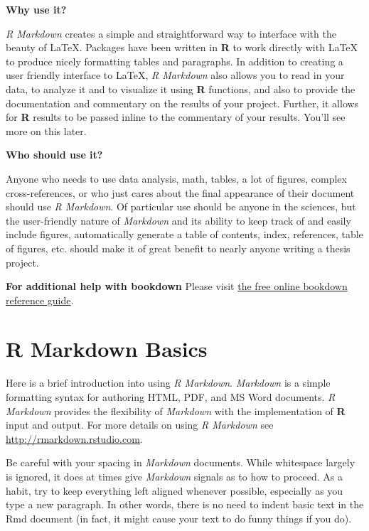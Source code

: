 \documentclass[
  letterpaper,
  12pt,
  twoside]{book}
\begin{document}
\textbf{Why use it?}

\emph{R Markdown} creates a simple and straightforward way to interface
with the beauty of LaTeX. Packages have been written in \textbf{R} to
work directly with LaTeX to produce nicely formatting tables and
paragraphs. In addition to creating a user friendly interface to LaTeX,
\emph{R Markdown} also allows you to read in your data, to analyze it
and to visualize it using \textbf{R} functions, and also to provide the
documentation and commentary on the results of your project. Further, it
allows for \textbf{R} results to be passed inline to the commentary of
your results. You'll see more on this later.

\textbf{Who should use it?}

Anyone who needs to use data analysis, math, tables, a lot of figures,
complex cross-references, or who just cares about the final appearance
of their document should use \emph{R Markdown}. Of particular use should
be anyone in the sciences, but the user-friendly nature of
\emph{Markdown} and its ability to keep track of and easily include
figures, automatically generate a table of contents, index, references,
table of figures, etc. should make it of great benefit to nearly anyone
writing a thesis project.

\textbf{For additional help with bookdown} Please visit
\href{https://bookdown.org/yihui/bookdown/}{the free online bookdown
reference guide}.


\chapter{R Markdown Basics}\label{rmd-basics}

Here is a brief introduction into using \emph{R Markdown}.
\emph{Markdown} is a simple formatting syntax for authoring HTML, PDF,
and MS Word documents. \emph{R Markdown} provides the flexibility of
\emph{Markdown} with the implementation of \textbf{R} input and output.
For more details on using \emph{R Markdown} see
\url{http://rmarkdown.rstudio.com}.

Be careful with your spacing in \emph{Markdown} documents. While
whitespace largely is ignored, it does at times give \emph{Markdown}
signals as to how to proceed. As a habit, try to keep everything left
aligned whenever possible, especially as you type a new paragraph. In
other words, there is no need to indent basic text in the Rmd document
(in fact, it might cause your text to do funny things if you do).
\end{document}
